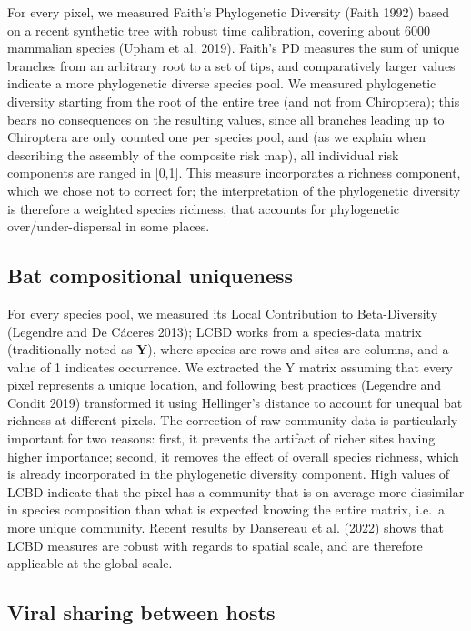 \documentclass[11pt]{article}
\begin{document}
For every pixel, we measured Faith's Phylogenetic Diversity (Faith 1992)
based on a recent synthetic tree with robust time calibration, covering
about 6000 mammalian species (Upham et al. 2019). Faith's PD measures
the sum of unique branches from an arbitrary root to a set of tips, and
comparatively larger values indicate a more phylogenetic diverse species
pool. We measured phylogenetic diversity starting from the root of the
entire tree (and not from Chiroptera); this bears no consequences on the
resulting values, since all branches leading up to Chiroptera are only
counted one per species pool, and (as we explain when describing the
assembly of the composite risk map), all individual risk components are
ranged in {[}0,1{]}. This measure incorporates a richness component,
which we chose not to correct for; the interpretation of the
phylogenetic diversity is therefore a weighted species richness, that
accounts for phylogenetic over/under-dispersal in some places.

\hypertarget{bat-compositional-uniqueness}{%
\subsection{Bat compositional
uniqueness}\label{bat-compositional-uniqueness}}

For every species pool, we measured its Local Contribution to
Beta-Diversity (Legendre and De Cáceres 2013); LCBD works from a
species-data matrix (traditionally noted as \(\mathbf{Y}\)), where
species are rows and sites are columns, and a value of 1 indicates
occurrence. We extracted the Y matrix assuming that every pixel
represents a unique location, and following best practices (Legendre and
Condit 2019) transformed it using Hellinger's distance to account for
unequal bat richness at different pixels. The correction of raw
community data is particularly important for two reasons: first, it
prevents the artifact of richer sites having higher importance; second,
it removes the effect of overall species richness, which is already
incorporated in the phylogenetic diversity component. High values of
LCBD indicate that the pixel has a community that is on average more
dissimilar in species composition than what is expected knowing the
entire matrix, i.e.~a more unique community. Recent results by Dansereau
et al. (2022) shows that LCBD measures are robust with regards to
spatial scale, and are therefore applicable at the global scale.

\hypertarget{viral-sharing-between-hosts}{%
\subsection{Viral sharing between
hosts}\label{viral-sharing-between-hosts}}
\end{document}

